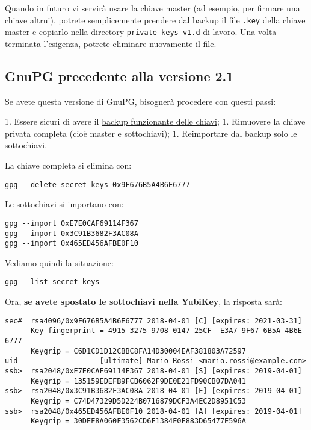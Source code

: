 \documentclass[a4paper,10pt]{article}
\begin{document}
Quando in futuro vi servirà usare la chiave master (ad esempio, per firmare una chiave altrui), potrete semplicemente prendere dal backup il file \texttt{.key} della chiave master e copiarlo nella directory \texttt{private-keys-v1.d} di lavoro. Una volta terminata l'esigenza, potrete eliminare nuovamente il file.

\subsection{GnuPG precedente alla versione 2.1}

Se avete questa versione di GnuPG, bisognerà procedere con questi passi:

1. Essere sicuri di avere il \hyperref[sec:backup-chiavi]{backup funzionante delle chiavi};
1. Rimuovere la chiave privata completa (cioè master e sottochiavi);
1. Reimportare dal backup solo le sottochiavi.

La chiave completa si elimina con:

\begin{lstlisting}
gpg --delete-secret-keys 0x9F676B5A4B6E6777
\end{lstlisting}

Le sottochiavi si importano con:

\begin{lstlisting}
gpg --import 0xE7E0CAF69114F367
gpg --import 0x3C91B3682F3AC08A
gpg --import 0x465ED456AFBE0F10
\end{lstlisting}

Vediamo quindi la situazione:

\begin{lstlisting}
gpg --list-secret-keys
\end{lstlisting}

Ora, \textbf{se avete spostato le sottochiavi nella YubiKey}, la risposta sarà:

\begin{lstlisting}
sec#  rsa4096/0x9F676B5A4B6E6777 2018-04-01 [C] [expires: 2021-03-31]
      Key fingerprint = 4915 3275 9708 0147 25CF  E3A7 9F67 6B5A 4B6E 6777
      Keygrip = C6D1CD1D12CBBC8FA14D30004EAF381803A72597
uid                   [ultimate] Mario Rossi <mario.rossi@example.com>
ssb>  rsa2048/0xE7E0CAF69114F367 2018-04-01 [S] [expires: 2019-04-01]
      Keygrip = 135159EDEFB9FCB6062F9DE0E21FD90CB07DA041
ssb>  rsa2048/0x3C91B3682F3AC08A 2018-04-01 [E] [expires: 2019-04-01]
      Keygrip = C74D47329D5D224B0716879DCF3A4EC2D8951C53
ssb>  rsa2048/0x465ED456AFBE0F10 2018-04-01 [A] [expires: 2019-04-01]
      Keygrip = 30DEE8A060F3562CD6F1384E0F883D65477E596A
\end{lstlisting}
\end{document}
